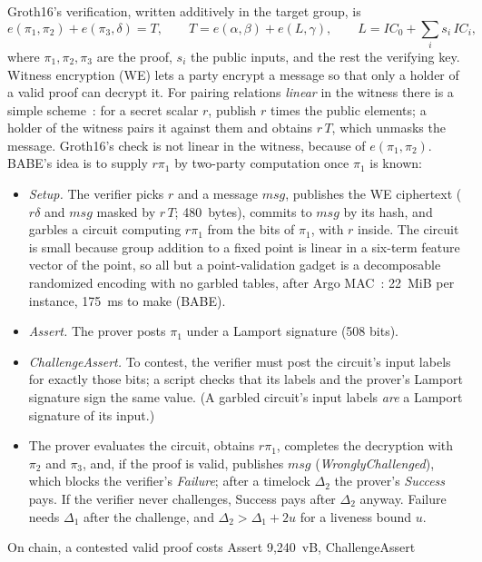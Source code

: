 \documentclass[11pt]{article}
\begin{document}
Groth16's verification, written additively in the target group, is
\[
  e(\pi_1, \pi_2) + e(\pi_3, \delta) = T, \qquad
  T = e(\alpha, \beta) + e(L, \gamma), \qquad
  L = \mathit{IC}_0 + \textstyle\sum_i s_i\, \mathit{IC}_i,
\]
where $\pi_1, \pi_2, \pi_3$ are the proof, $s_i$ the public inputs, and
the rest the verifying key. Witness encryption (WE) lets a party encrypt
a message so that only a holder of a valid proof can decrypt it. For
pairing relations \emph{linear} in the witness there is a simple
scheme~\cite{gkpw24}: for a secret scalar $r$, publish $r$ times the
public elements; a holder of the witness pairs it against them and
obtains $r\,T$, which unmasks the message. Groth16's check is not linear
in the witness, because of $e(\pi_1, \pi_2)$. BABE's idea is to supply
$r\pi_1$ by two-party computation once $\pi_1$ is known:
\begin{itemize}[leftmargin=1.5em]
\item \emph{Setup.} The verifier picks $r$ and a message $\mathit{msg}$,
  publishes the WE ciphertext ($r\delta$ and $\mathit{msg}$ masked by
  $r\,T$; 480~bytes), commits to $\mathit{msg}$ by its hash, and
  garbles a circuit computing $r\pi_1$ from the bits of $\pi_1$, with $r$
  inside. The circuit is small because group addition to a fixed point
  is linear in a six-term feature vector of the point, so all but a
  point-validation gadget is a decomposable randomized encoding with no
  garbled tables, after Argo MAC~\cite{argo}: 22~MiB per instance, 175~ms
  to make (BABE).
\item \emph{Assert.} The prover posts $\pi_1$ under a Lamport signature
  (508 bits).
\item \emph{ChallengeAssert.} To contest, the verifier must post the
  circuit's input labels for exactly those bits; a script checks that
  its labels and the prover's Lamport signature sign the same value. (A
  garbled circuit's input labels \emph{are} a Lamport signature of its
  input.)
\item The prover evaluates the circuit, obtains $r\pi_1$, completes the
  decryption with $\pi_2$ and $\pi_3$, and, if the proof is valid,
  publishes $\mathit{msg}$ (\emph{WronglyChallenged}), which blocks the
  verifier's \emph{Failure}; after a timelock $\Delta_2$ the prover's
  \emph{Success} pays. If the verifier never challenges, Success pays
  after $\Delta_2$ anyway. Failure needs $\Delta_1$ after the challenge,
  and $\Delta_2 > \Delta_1 + 2u$ for a liveness bound $u$.
\end{itemize}
On chain, a contested valid proof costs Assert 9,240~vB, ChallengeAssert
\end{document}

